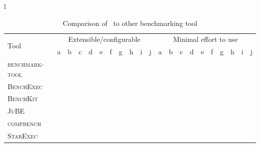 \begin{table}
    \caption{Comparison of \OurBenchmarkingTool~to other benchmarking tool}
        \label{tab:eval.compare.req}
    \begin{threeparttable}
        \begin{adjustbox}{max width=\textwidth}
            \begin{tabular}{l}
                \begin{tabular}{l | cccccccccc | cccccccccc}
                    \toprule
                    \multirow{2}{*}{Tool} &
                        \multicolumn{10}{c|}{Extensible/configurable} &
                        \multicolumn{10}{c}{Minimal effort to use}\\
                        & a & b & c & d & e & f & g & h & i & j &
                        a & b & c & d & e & f & g & h & i & j\\
                    \midrule
                    \textsc{benchmark-tool} &
                        & \checkmark & \checkmark & \checkmark & \checkmark & \checkmark & \checkmark & & \checkmark & \checkmark &
                        \checkmark & \checkmark & & & & \checkmark & & & &\\
                    \textsc{BenchExec} &
                        & & & \checkmark & \checkmark & & \checkmark & & \checkmark & &
                        \checkmark & \checkmark & \checkmark & \checkmark & & & & & \checkmark & \checkmark\\
                    \textsc{BenchKit} &
                        & \checkmark & & & \checkmark & & \checkmark & & \checkmark & &
                        & \checkmark & \checkmark & & & & & & \checkmark &\\
                    \textsc{JuBE} &
                        \checkmark & \checkmark & & \checkmark & \checkmark & \checkmark & \checkmark & \checkmark & \checkmark & \checkmark &
                        \checkmark & \checkmark & \checkmark & \checkmark & \checkmark & \checkmark & \checkmark & \checkmark & &\\
                    \textsc{compbench} &
                        \checkmark & \checkmark & & \checkmark & \checkmark & & \checkmark & \checkmark & \checkmark & &
                        \checkmark & & & & & \checkmark & & \checkmark & \checkmark &\\
                    \textsc{StarExec} &
                        \checkmark & \checkmark & \checkmark & & \checkmark & & \checkmark & & \checkmark & \checkmark &
						\checkmark & \checkmark & \checkmark & \checkmark & & \checkmark & \checkmark & \checkmark & \checkmark & \checkmark\\

\end{tabular}
\end{tabular}
\end{adjustbox}
\end{threeparttable}
\end{table}
